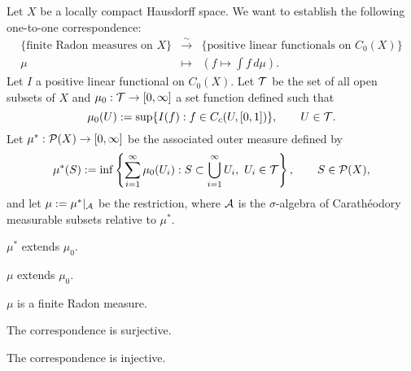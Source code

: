 \documentclass{../../large}
\begin{document}
\begin{prb}
Let $X$ be a locally compact Hausdorff space.
We want to establish the following one-to-one correspondence:
\[\begin{array}{ccc}
\{\text{finite Radon measures on $X$}\} & \xrightarrow{\sim} & \{\text{positive linear functionals on $C_0(X)$}\}\\
\mu & \mapsto & (f\mapsto\int f\,d\mu).
\end{array}\]
Let $I$ a positive linear functional on $C_0(X)$.
Let $\mathcal{T}$ be the set of all open subsets of $X$ and $\mu_0:\mathcal{T}\to[0,\infty]$ a set function defined such that
\[\mu_0(U):=\sup\{I(f):f\in C_c(U,[0,1])\},\qquad U\in\mathcal{T}.\]
Let $\mu^*:\mathcal{P}(X)\to[0,\infty]$ be the associated outer measure defined by
\[\mu^*(S):=\inf\left\{\sum_{i=1}^\infty\mu_0(U_i):S\subset\bigcup_{i=1}^\infty U_i,\ U_i\in\mathcal{T}\right\},\qquad S\in\mathcal{P}(X),\]
and let $\mu:=\mu^*|_{\mathcal{A}}$ be the restriction, where $\mathcal{A}$ is the $\sigma$-algebra of Carath\'eodory measurable subsets relative to $\mu^*$.
\begin{parts}
\item $\mu^*$ extends $\mu_0$.
\item $\mu$ extends $\mu_0$.
\item $\mu$ is a finite Radon measure.
\item The correspondence is surjective.
\item The correspondence is injective.
\end{parts}
\end{prb}
\end{document}
